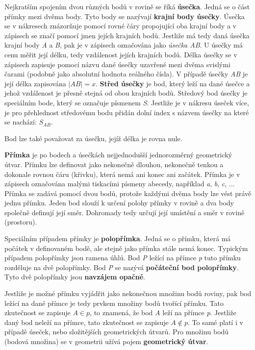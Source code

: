 \vskip 4mm
\centerline{}
\vskip 4mm

Nejkratším spojením dvou různých bodů v rovině se říká  {\bf úsečka}. Jedná se o část přímky mezi dvěma body. Tyto body se nazývají {\bf krajní body úsečky}. Úsečka se v nákresech znázorňuje pomocí rovné čáry propojující oba krajní body a v zápisech se značí pomocí jmen jejích krajních bodů. Jestliže má tedy daná úsečka krajní body {\it A} a {\it B}, pak je v zápisech označována jako {\it úsečka AB}. U úsečky má cenu měřit její délku, tedy vzdálenost jejích krajních bodů. Délka úsečky se v zápisech zapisuje pomocí názvu dané úsečky uzavřené mezi dvěma svislými čarami (podobně jako absolutní hodnota reálného čísla). V případě úsečky {\it AB} je její délka zapisována $|AB|=x$. {\bf Střed úsečky} je bod, který leží na dané úsečce a jehož vzdálenost je přesně stejná od obou krajních bodů. Středový bod úsečky je speciálním bode, který se označuje písmenem {\it S}. Jestliže je v nákresu úseček více, je pro přehlednost středovému bodu přidán dolní index s názvem úsečky na které se nachází: $S_{AB}$.

\vskip 4mm
\centerline{}
\vskip 4mm

Bod lze také považovat za úsečku, jejíž délka je rovna nule.


{\bf Přímka} je po bodech a úsečkách nejjednodušší jednorozměrný geometrický útvar. Přímku lze definovat jako nekonečně dlouhou, nekonečně tenkou a dokonale rovnou čáru (křivku), která nemá ani konec ani začátek. Přímka je v zápisech označována malými tiskacími písmeny abecedy, například {\it a}, {\it b}, {\it c}, ... Přímka se zadává pomocí dvou bodů, protože každými dvěma body lze vést právě jednu přímku. Jeden bod slouží k určení polohy přímky v rovině a dva body společně definují její směr. Dohromady tedy určují její umístění a směr v rovině (prostoru).

\vskip 4mm
\centerline{}
\vskip 4mm

Speciálním případem přímky je {\bf polopřímka}. Jedná se o přímku, která má počátek v definovaném bodě, ale stejně jako přímka stále nemá konec. Typickým případem polopřímky jsou ramena úhlů. Bod {\it P} ležící na přímce {\it p} tuto přímku rozděluje na dvě polopřímky. Bod {\it P} se nazývá {\bf počáteční bod polopřímky}. Tyto dvě polopřímky jsou {\bf navzájem opačné}.

Jestliže je možné přímku vyjádřit jako nekonečnou množinu bodů roviny, pak bod ležící na dané přímce je tedy prvkem množiny bodů tvořící přímku. Tato zkutečnost se zapisuje $A \in p$, to znamená, že bod {\it A} leží na přímce {\it p}. Jestliže daný bod neleží na přímce, tato zkutečnost se zapisuje $A \notin p$. To samé platí i v případě úseček, nebo složitějších geometrických útvarů. Pro množinu bodů (bodová množina) se v geometrii užívá pojem {\bf geometrický útvar}.


